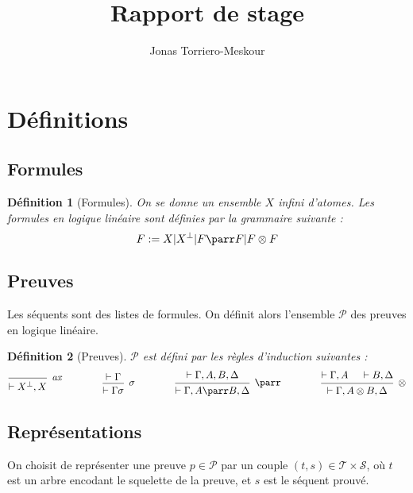 \documentclass[11pt,a4paper]{article}
\title{Rapport de stage}
\author{Jonas Torriero-Meskour}
\newtheorem{definition}{Définition}
\newcommand*{\orth}{^\perp}
\newcommand*{\tensor}{\otimes}
\newcommand*{\hypv}[1]{\hypo{\vdash #1}}
\newcommand*{\axv}[1]{\infer{0}[\ensuremath{\mathit{ax}}]{\vdash #1}}
\newcommand*{\tensorv}[1]{\infer{2}[\ensuremath{\tensor}]{\vdash #1}}
\newcommand*{\parrv}[1]{\infer{1}[\ensuremath{\parr}]{\vdash #1}}
\newcommand*{\permv}[1]{\infer{1}[\ensuremath{\sigma}]{\vdash #1}}
\newcommand*{\proofs}{\ensuremath{\mathcal{P}}}
\newcommand*{\trees}{\ensuremath{\mathcal{T}}}
\begin{document}
\maketitle

\section{Définitions}

\subsection{Formules}
\begin{definition}[Formules]
On se donne un ensemble $X$ infini d'atomes. Les formules en logique linéaire sont définies par la grammaire suivante :
\begin{equation*}
F := X | X\orth | F \parr F | F \tensor F
\end{equation*}
\end{definition}

\subsection{Preuves}
Les séquents sont des listes de formules. On définit alors l'ensemble \proofs{} des preuves en logique linéaire.
\begin{definition}[Preuves]
\proofs{} est défini par les règles d'induction suivantes :
\begin{equation*}
\begin{prooftree}
  \axv{X\orth, X}
\end{prooftree}
\qquad\qquad
\begin{prooftree}
  \hypv{\Gamma}
  \permv{\Gamma{\sigma}}
\end{prooftree}
\qquad\qquad
\begin{prooftree}
  \hypv{\Gamma, A, B, \Delta}
  \parrv{\Gamma, A \parr B, \Delta}
\end{prooftree}
\qquad\qquad
\begin{prooftree}
  \hypv{\Gamma, A}
  \hypv{B, \Delta}
  \tensorv{\Gamma, A \tensor B, \Delta}
\end{prooftree}
\end{equation*}
\end{definition}

\subsection{Représentations}
On choisit de représenter une preuve $p \in \mathcal{P}$ par un couple $(t, s) \in \trees \times \mathcal{S}$, où $t$ est un arbre encodant le squelette de la preuve, et $s$ est le séquent prouvé.
\end{document}
